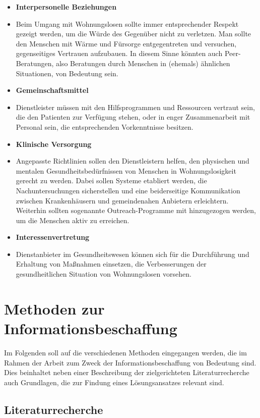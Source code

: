 \begin{itemize}
	\item \textbf{Interpersonelle Beziehungen}
	\item[] Beim Umgang mit Wohnungslosen sollte immer entsprechender Respekt gezeigt werden, um die Würde des Gegenüber nicht zu verletzen. Man sollte den Menschen mit Wärme und Fürsorge entgegentreten und versuchen, gegenseitiges Vertrauen aufzubauen. In diesem Sinne könnten auch Peer-Beratungen, also Beratungen durch Menschen in (ehemals) ähnlichen Situationen, von Bedeutung sein.
	\item \textbf{Gemeinschaftsmittel}
	\item[] Dienstleister müssen mit den Hilfsprogrammen und Ressourcen vertraut sein, die den Patienten zur Verfügung stehen, oder in enger Zusammenarbeit mit Personal sein, die entsprechenden Vorkenntnisse besitzen.
	\item \textbf{Klinische Versorgung}
	\item[] Angepasste Richtlinien sollen den Dienstleistern helfen, den physischen und mentalen Gesundheitsbedürfnissen von Menschen in Wohnungslosigkeit gerecht zu werden. Dabei sollen Systeme etabliert werden, die Nachuntersuchungen sicherstellen und eine beiderseitige Kommunikation zwischen Krankenhäusern und gemeindenahen Anbietern erleichtern. Weiterhin sollten sogenannte Outreach-Programme mit hinzugezogen werden, um die Menschen aktiv zu erreichen.
	\item \textbf{Interessenvertretung}
	\item[] Dienstanbieter im Gesundheitswesen können sich für die Durchführung und Erhaltung von Maßnahmen einsetzen, die Verbesserungen der gesundheitlichen Situation von Wohnungslosen vorsehen.
\end{itemize}


\section{Methoden zur Informationsbeschaffung}

Im Folgenden soll auf die verschiedenen Methoden eingegangen werden, die im Rahmen der Arbeit zum Zweck der Informationsbeschaffung von Bedeutung sind. Dies beinhaltet neben einer Beschreibung der zielgerichteten Literaturrecherche auch Grundlagen, die zur Findung eines Lösungsansatzes relevant sind.

\subsection{Literaturrecherche}

